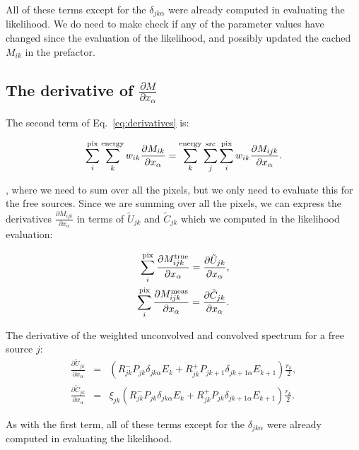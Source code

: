 \documentclass[preprint]{aastex}
\begin{document}
\noindent All of these terms except for the $\delta_{jk\alpha}$ were
already computed in evaluating the likelihood.  We do need to make
check if any of the parameter values have changed since the evaluation
of the likelihood, and possibly updated the cached $M_{ik}$ in the 
prefactor. 

\subsection{The derivative of  $\frac{\partial M}{\partial x_{\alpha}}$}\label{subsec:derivatives_part2}

The second term of Eq.~\ref{eq:derivatives} is:

\begin{equation}
  \sum_i^{\rm pix} \sum_k^{\rm energy} w_{ik}\frac{\partial M_{ik}}{\partial x_{\alpha}} = 
  \sum_k^{\rm energy} \sum_j^{\rm src} \sum_i^{\rm pix} w_{ik} \frac{\partial M_{ijk}}{\partial x_{\alpha}}.
\end{equation}

\noindent, where we need to sum over all the pixels, but we only need
to evaluate this for the free sources.  Since we are summing over all
the pixels, we can express the derivatives $\frac{\partial
  M_{ijk}}{\partial x_{\alpha}}$ in terms of $\tilde{U}_{jk}$ and
$\tilde{C}_{jk}$ which we computed in the likelihood evaluation:

\begin{eqnarray}
  \sum_i^{\rm pix} \frac{\partial M_{ijk}^{\rm true}}{\partial x_{\alpha}} = \frac{\partial\tilde{U}_{jk}}{\partial x_{\alpha}}, \nonumber \\
  \sum_i^{\rm pix} \frac{\partial M_{ijk}^{\rm meas}}{\partial x_{\alpha}} = \frac{\partial\tilde{C}_{jk}}{\partial x_{\alpha}}.  
\end{eqnarray}


The derivative of the weighted unconvolved and convolved spectrum for
a free source $j$:
\begin{eqnarray}
  \frac{\partial\tilde{U}_{jk}}{\partial x_{\alpha}} & = & ( R_{jk}^{-} P_{jk} \delta_{jk\alpha} E_k + R_{jk}^{+} P_{jk+1} \delta_{jk+1\alpha} E_{k+1} )  \frac{r_k}{2}, \nonumber \\
  \frac{\partial\tilde{C}_{jk}}{\partial x_{\alpha}} & = & \xi_{jk} ( R_{jk}^{-}  P_{jk} \delta_{jk\alpha} E_k + R_{jk}^{+} P_{jk} \delta_{jk+1\alpha} E_{k+1} ) \frac{r_k}{2}.
\end{eqnarray}

As with the first term, all of these terms except for the
$\delta_{jk\alpha}$ were already computed in evaluating the
likelihood.
\end{document}
